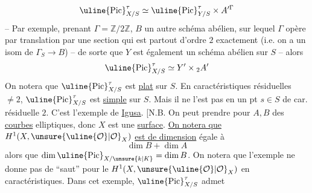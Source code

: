 \[
\uline{\operatorname{Pic}}_{X/S}^{\tau}\simeq\uline{\operatorname{Pic}}_{Y/S}^{\tau}\times A'^{\Gamma}
\]
-- Par exemple, prenant $\Gamma=\mathbb Z/2\mathbb Z$,  $B$ un autre schéma abélien, sur lequel $\Gamma$ opère par translation par une section qui est partout d'ordre $2$ exactement (i.e. on a un isom de $\Gamma_S\longrightarrow B$) -- de sorte que $Y$ est également un schéma abélien sur $S$ -- alors
\[
\uline{\operatorname{Pic}}_{X/S}^{\tau}\simeq Y'\times {}_2 A'
\]
On notera que $\uline{\operatorname{Pic}}_{X/S}^{\tau}$ est \uline{plat} sur $S$.
En caractéristiques résiduelles $\ne 2$, $\uline{\operatorname{Pic}}_{X/S}^{\tau}$ est \unsure{$=$}  \uline{simple} sur $S$. Mais il ne l'est pas en un pt $s\in S$ de car. résiduelle $2$.
C'est l'exemple de \uline{Igusa}. [N.B. On peut prendre pour $A,B$ des \uline{courbes} elliptiques, donc $X$ est une \uline{surface}.  \uline{On notera que} $H^1(X,\unsure{\uline{\mathcal O}|\mathcal O}_X)$ \uline{est de dimension} égale à
\[
\dim B+\dim A
\]
alors que $\dim\uline{\operatorname{Pic}}_{X/\unsure{k|K}}=\dim B$. On notera que l'exemple ne donne pas de ``saut'' pour le $H^1(X,\unsure{\uline{\mathcal O}|\mathcal O}_X)$ en  caractéristiques. Dans cet exemple, $\uline{\operatorname{Pic}}_{X/S}^{\tau}$ admet
